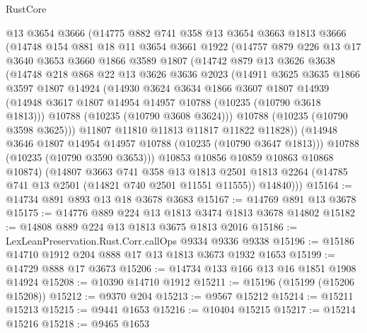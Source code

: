\begin{lexlean}{RustCore}
\begin{coremodule}
      @13
      @3654
      @3666
      (@14775
        @882
        @741
        @358
        @13
        @3654
        @3663
        @1813
        @3666
        (@14748
          @154
          @881
          @18
          @11
          @3654
          @3661
          @1922
          (@14757
            @879
            @226
            @13
            @17
            @3640
            @3653
            @3660
            @1866
            @3589
            @1807
            (@14742
              @879
              @13
              @3626
              @3638
              (@14748
                @218
                @868
                @22
                @13
                @3626
                @3636
                @2023
                (@14911
                  @3625
                  @3635
                  @1866
                  @3597
                  @1807
                  @14924
                  (@14930
                    @3624
                    @3634
                    @1866
                    @3607
                    @1807
                    @14939
                    (@14948 @3617 @1807 @14954 @14957 @10788 (@10235 (@10790 @3618 @1813)))
                    @10788
                    (@10235 (@10790 @3608 @3624)))
                  @10788
                  (@10235 (@10790 @3598 @3625)))
                @11807
                @11810
                @11813
                @11817
                @11822
                @11828))
            (@14948 @3646 @1807 @14954 @14957 @10788 (@10235 (@10790 @3647 @1813)))
            @10788
            (@10235 (@10790 @3590 @3653)))
          @10853
          @10856
          @10859
          @10863
          @10868
          @10874)
        (@14807
          @3663
          @741
          @358
          @13
          @1813
          @2501
          @1813
          @2264
          (@14785 @741 @13 @2501 (@14821 @740 @2501 @11551 @11555))
          @14840)))
@15164 := @14734 @891 @893 @13 @18 @3678 @3683
@15167 := @14769 @891 @13 @3678
@15175 := @14776 @889 @224 @13 @1813 @3474 @1813 @3678 @14802
@15182 := @14808 @889 @224 @13 @1813 @3675 @1813 @2016
@15186 := LexLeanPreservation.Rust.Corr.callOps @9334 @9336 @9338
@15196 := @15186 @14710 @1912 @204 @888 @17 @13 @1813 @3673 @1932 @1653
@15199 := @14729 @888 @17 @3673
@15206 := @14734 @133 @166 @13 @16 @1851 @1908 @14924
@15208 := @10390 @14710 @1912
@15211 := @15196 (@15199 (@15206 @15208))
@15212 := @9370 @204
@15213 := @9567 @15212
@15214 := @15211 @15213
@15215 := @9441 @1653
@15216 := @10404 @15215
@15217 := @15214 @15216
@15218 := @9465 @1653

\end{coremodule}
\end{lexlean}
